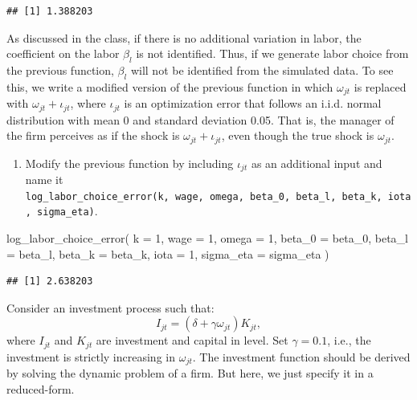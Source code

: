 \documentclass[
]{book}
\newenvironment{Shaded}{\begin{snugshade}}{\end{snugshade}}
\newcommand{\AttributeTok}[1]{\textcolor[rgb]{0.77,0.63,0.00}{#1}}
\newcommand{\DecValTok}[1]{\textcolor[rgb]{0.00,0.00,0.81}{#1}}
\newcommand{\FunctionTok}[1]{\textcolor[rgb]{0.00,0.00,0.00}{#1}}
\newcommand{\NormalTok}[1]{#1}
\providecommand{\tightlist}{%
  \setlength{\itemsep}{0pt}\setlength{\parskip}{0pt}}
\begin{document}
\begin{verbatim}
## [1] 1.388203
\end{verbatim}

As discussed in the class, if there is no additional variation in labor, the coefficient on the labor \(\beta_l\) is not identified. Thus, if we generate labor choice from the previous function, \(\beta_l\) will not be identified from the simulated data. To see this, we write a modified version of the previous function in which \(\omega_{jt}\) is replaced with \(\omega_{jt} + \iota_{jt}\), where \(\iota_{jt}\) is an optimization error that follows an i.i.d. normal distribution with mean 0 and standard deviation 0.05. That is, the manager of the firm perceives as if the shock is \(\omega_{jt} + \iota_{jt}\), even though the true shock is \(\omega_{jt}\).

\begin{enumerate}
\def\labelenumi{\arabic{enumi}.}
\setcounter{enumi}{3}
\tightlist
\item
  Modify the previous function by including \(\iota_{jt}\) as an additional input and name it \texttt{log\_labor\_choice\_error(k,\ wage,\ omega,\ beta\_0,\ beta\_l,\ beta\_k,\ iota,\ sigma\_eta)}.
\end{enumerate}

\begin{Shaded}
\begin{Highlighting}[]
\FunctionTok{log\_labor\_choice\_error}\NormalTok{(}
  \AttributeTok{k =} \DecValTok{1}\NormalTok{, }
  \AttributeTok{wage =} \DecValTok{1}\NormalTok{, }
  \AttributeTok{omega =} \DecValTok{1}\NormalTok{, }
  \AttributeTok{beta\_0 =}\NormalTok{ beta\_0, }
  \AttributeTok{beta\_l =}\NormalTok{ beta\_l, }
  \AttributeTok{beta\_k =}\NormalTok{ beta\_k, }
  \AttributeTok{iota =} \DecValTok{1}\NormalTok{, }
  \AttributeTok{sigma\_eta =}\NormalTok{ sigma\_eta}
\NormalTok{  )}
\end{Highlighting}
\end{Shaded}

\begin{verbatim}
## [1] 2.638203
\end{verbatim}

Consider an investment process such that:
\[
I_{jt} = (\delta + \gamma \omega_{jt}) K_{jt},
\]
where \(I_{jt}\) and \(K_{jt}\) are investment and capital in level. Set \(\gamma = 0.1\), i.e., the investment is strictly increasing in \(\omega_{jt}\). The investment function should be derived by solving the dynamic problem of a firm. But here, we just specify it in a reduced-form.
\end{document}
